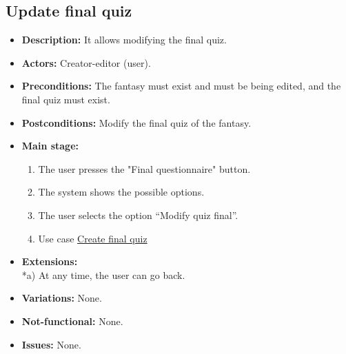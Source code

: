 \subsection{Update final quiz}
\begin{itemize}
	\item \textbf{Description:} It allows modifying the final quiz.
	\item \textbf{Actors:} Creator-editor (user).
	\item \textbf{Preconditions:} The fantasy must exist and must be being edited, and the final quiz must exist.
	\item \textbf{Postconditions:} Modify the final quiz of the fantasy.
	\item \textbf{Main stage:}
	\begin{enumerate}
		\item The user presses the "Final questionnaire" button.
		\item The system shows the possible options.
		\item The user selects the option ``Modify quiz final''.
		\item Use case \hyperlink{crearquizfinal}{Create final quiz}
	\end{enumerate}
	\item \textbf{Extensions:} \\ *a) At any time, the user can go back.
	\item \textbf{Variations:} None.
	\item \textbf{Not-functional:} None.
	\item \textbf{Issues:} None.
\end{itemize}

